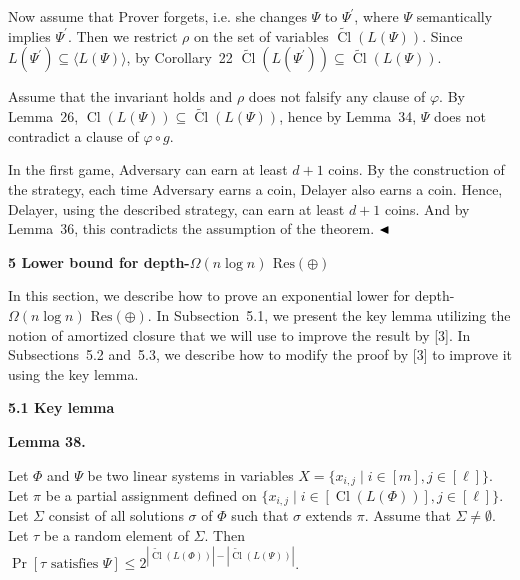 \documentclass[10pt,a4paper]{article}
\begin{document}
Now assume that Prover forgets, i.e. she changes $\Psi$ to $\Psi^{\prime}$, where $\Psi$ semantically implies $\Psi^{\prime}$. Then we restrict $\rho$ on the set of variables $\widetilde{\mathop{\mathrm{Cl}}}(L(\Psi))$.
Since $L(\Psi^{\prime})\subseteq\langle L(\Psi)\rangle$, by Corollary 22 $\widetilde{\mathop{\mathrm{Cl}}}(L(\Psi^{\prime}))\subseteq\widetilde{\mathop{\mathrm{Cl}}}(L(\Psi))$.\par



Assume that the invariant holds and $\rho$ does not falsify any clause of $\varphi$. By Lemma 26, $\mathop{\mathrm{Cl}}(L(\Psi))\subseteq\widetilde{\mathop{\mathrm{Cl}}}(L(\Psi))$, hence by Lemma 34, $\Psi$ does not contradict a clause of $\varphi\circ g$.\par



In the first game, Adversary can earn at least $d+1$ coins.
By the construction of the strategy, each time Adversary earns a coin, Delayer also earns a coin. Hence, Delayer, using the described strategy, can earn at least $d+1$ coins. And by Lemma 36, this contradicts the assumption of the theorem.
$\hfill\blacktriangleleft$\par


\par\medskip\noindent\textbf{
5 Lower bound for depth-$\Omega(n\log n)$ $\mathrm{Res}(\oplus)$
}\par


In this section, we describe how to prove an exponential lower for depth-$\Omega(n\log n)$ $\mathrm{Res}(\oplus)$. In Subsection 5.1, we present the key lemma utilizing the notion of amortized closure that we will use to improve the result by [3]. In Subsections 5.2 and 5.3, we describe how to modify the proof by [3] to improve it using the key lemma.\par


\par\medskip\noindent\textbf{
5.1 Key lemma}\par


\par\medskip\noindent\textbf{
Lemma 38.
}\par



Let $\Phi$ and $\Psi$ be two linear systems in variables $X=\{x_{i,j}\mid i\in[m],j\in[\ell]\}$. Let $\pi$ be a partial assignment defined on $\{x_{i,j}\mid i\in[\mathop{\mathrm{Cl}}(L(\Phi))],j\in[\ell]\}$. Let $\Sigma$ consist of all solutions $\sigma$ of $\Phi$ such that $\sigma$ extends $\pi$. Assume that $\Sigma\neq\emptyset$. Let $\tau$ be a random element of $\Sigma$. Then $\Pr[\tau\mbox{ satisfies }\Psi]\leq 2^{|\widetilde{\mathop{\mathrm{Cl}}}(L(\Phi))|-|\widetilde{\mathop{\mathrm{Cl}}}(L(\Psi))|}$.\par
\end{document}
